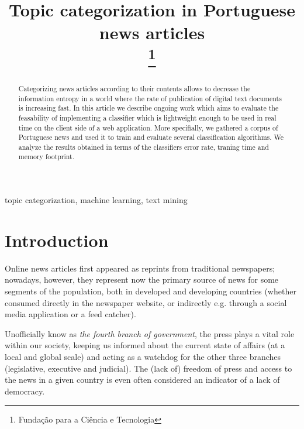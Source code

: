 \documentclass[conference]{IEEEtran}
\begin{document}

\title{Topic categorization in Portuguese news articles\\
\thanks{Fundação para a Ciência e Tecnologia} }


\author{
 }

\maketitle

\begin{abstract}
Categorizing news articles according to their contents allows to
decrease the information entropy in a world where the rate of
publication of digital text documents is increasing fast. In this
article we describe ongoing work which aims to evaluate the
feasability of implementing a classifier which is lightweight
enough to be used in real time on the client side of a web
application.  More specifially, we gathered a corpus of Portuguese
news and used it to train and evaluate several classification
algorithms. We analyze the results obtained in terms of the
classifiers error rate, traning time and memory footprint.
\end{abstract}

\begin{IEEEkeywords} topic categorization, machine learning, text
mining \end{IEEEkeywords}

\section{Introduction}
Online news articles first appeared as reprints from traditional
newspapers; nowadays, however, they represent now the primary source
of news for some segments of the population, both in developed and
developing countries (whether consumed directly in the newspaper
website, or indirectly e.g. through a social media application or a
feed catcher)\cite{greer2006evolution,boczkowski2005digitizing,chyi1999access}.

Unofficially know as \emph{the fourth branch of government}, the press
plays a vital role within our society, keeping us informed about
the current state of affairs (at a local and global scale) and acting
as a watchdog for the other three branches (legislative, executive and
judicial). The (lack of) freedom of press and access to the news in a
given country is even often considered an indicator of a lack of
democracy\cite{goode2009social,house2009freedom}.
\end{document}
